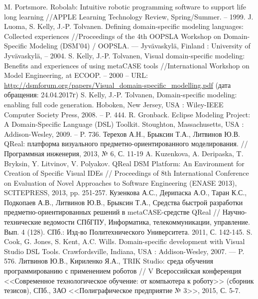 \documentclass{spisok-article}
\begin{document}
\renewcommand\refname{Литература}
\begin{thebibliography}{8}
	 M. Portsmore. Robolab: Intuitive robotic programming software to support life long learning //APPLE Learning Technology Review, Spring/Summer. -- 1999.
	 J. Luoma, S. Kelly, J.-P. Tolvanen. Defining domain-specific modeling languages: Collected experiences //Proceedings of the 4th OOPSLA Workshop on Domain-Specific Modeling (DSM’04) / OOPSLA. –– Jyvävaskylä, Finland : University of Jyvävaskylä, -- 2004.
	 S. Kelly, J.-P. Tolvanen, Visual domain-specific modeling: Benefits and experiences of using metaCASE tools //International Workshop on Model Engineering, at ECOOP. -- 2000 -- URL: \url{http://dsmforum.org/papers/Visual_domain-specific_modelling.pdf} (дата обращения: 24.04.2017г)
	 S. Kelly, J.-P. Tolvanen, Domain-specific modeling: enabling full code generation. Hoboken, New Jersey, USA : Wiley-IEEE Computer Society Press, 2008. -- P. 444.
	 R. Gronback. Eclipse Modeling Project: A Domain-Specific Language (DSL) Toolkit. Stoughton, Massachusetts, USA : Addison-Wesley, 2009. -- P. 736.
	 Терехов А.Н., Брыксин Т.А., Литвинов Ю.В. QReal: платформа визуального предметно-ориентированного моделирования. // Программная инженерия, 2013, № 6, С. 11-19
	 A. Kuzenkova, A. Deripaska, T. Bryksin, Y. Litvinov, V. Polyakov. QReal DSM Platform: An Environment for Creation of Specific Visual IDEs // Proceedings of 8th International Conference on Evaluation of Novel Approaches to Software Engineering (ENASE 2013), SCITEPRESS, 2013, pp. 251-257.
	 Кузенкова А.С., Дерипаска А.О., Таран К.С., Подкопаев А.В., Литвинов Ю.В., Брыксин Т.А., Средства быстрой разработки предметно-ориентированных решений в metaCASE-средстве QReal // Научно-технические ведомости СПбГПУ, Информатика, телекоммуникации, управление. Вып. 4 (128). СПб.: Изд-во Политехнического Университета. 2011, С. 142-145.
	 S. Cook, G. Jones, S. Kent, A.C. Wills. Domain-specific development with Visual Studio DSL Tools. Crawfordsville, Indiana, USA : Addison-Wesley, 2007. –– P. 576.
	 Литвинов Ю.В., Кириленко Я.А., TRIK Studio: среда обучения программированию с применением роботов // V Всероссийская конференция <<Современное технологическое обучение: от компьютера к роботу>> (сборник тезисов), СПб., ЗАО <<Полиграфическое предприятие № 3>>, 2015, С. 5-7.

\end{thebibliography}
\end{document}

